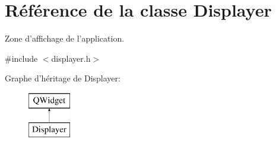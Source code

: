 \hypertarget{classDisplayer}{\section{Référence de la classe Displayer}
\label{classDisplayer}
}


Zone d'affichage de l'application.  




{\ttfamily \#include $<$displayer.\-h$>$}

Graphe d'héritage de Displayer\-:\begin{figure}[H]
\begin{center}
\leavevmode
\includegraphics[height=2.000000cm]{classDisplayer}
\end{center}
\end{figure}
